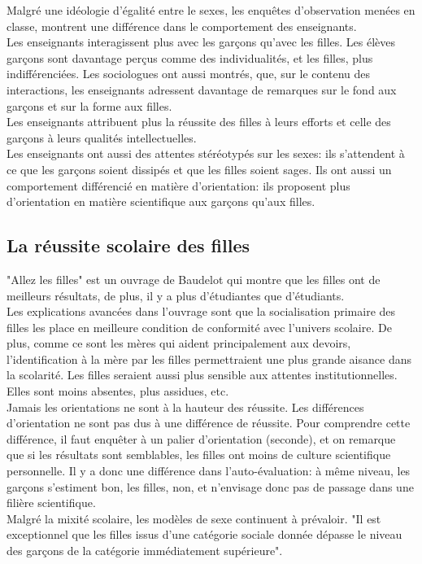 \documentclass[10pt, a4paper, openany]{book}
\begin{document}
Malgré une idéologie d'égalité entre le sexes, les enquêtes d'observation menées en classe, montrent une différence dans le comportement des enseignants. \\
Les enseignants interagissent plus avec les garçons qu'avec les filles. Les élèves garçons sont davantage perçus comme des individualités, et les filles, plus indifférenciées. Les sociologues ont aussi montrés, que, sur le contenu des interactions, les enseignants adressent davantage de remarques sur le fond aux garçons et sur la forme aux filles. \\
Les enseignants attribuent plus la réussite des filles à leurs efforts et celle des garçons à leurs qualités intellectuelles. \\
Les enseignants ont aussi des attentes stéréotypés sur les sexes: ils s'attendent à ce que les garçons soient dissipés et que les filles soient sages. Ils ont aussi un comportement différencié en matière d'orientation: ils proposent plus d'orientation en matière scientifique aux garçons qu'aux filles. 

\subsection{La réussite scolaire des filles}

"Allez les filles" est un ouvrage de Baudelot qui montre que les filles ont de meilleurs résultats, de plus, il y a plus d'étudiantes que d'étudiants. \\
Les explications avancées dans l'ouvrage sont que la socialisation primaire des filles les place en meilleure condition de conformité avec l'univers scolaire. De plus, comme ce sont les mères qui aident principalement aux devoirs, l'identification à la mère par les filles permettraient une plus grande aisance dans la scolarité. Les filles seraient aussi plus sensible aux attentes institutionnelles. Elles sont moins absentes, plus assidues, etc. \\
Jamais les orientations ne sont à la hauteur des réussite. Les différences d'orientation ne sont pas dus à une différence de réussite. Pour comprendre cette différence, il faut enquêter à un palier d'orientation (seconde), et on remarque que si les résultats sont semblables, les filles ont moins de culture scientifique personnelle. Il y a donc une différence dans l'auto-évaluation: à même niveau, les garçons s'estiment bon, les filles, non, et n'envisage donc pas de passage dans une filière scientifique. \\
Malgré la mixité scolaire, les modèles de sexe continuent à prévaloir. "Il est exceptionnel que les filles issus d'une catégorie sociale donnée dépasse le niveau des garçons de la catégorie immédiatement supérieure". 
\end{document}
